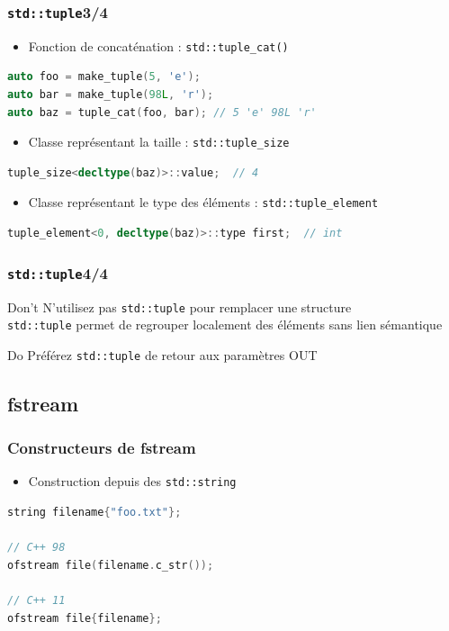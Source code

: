 \documentclass[C++.tex]{subfiles}
\begin{document}
\begin{frame}[fragile]
	\frametitle{\lstinline|std::tuple|\titlehfill{}3/4}
	\begin{itemize}
		\item Fonction de concaténation : \lstinline|std::tuple_cat()|
	\end{itemize}

	\begin{lstlisting}[language=C++]
auto foo = make_tuple(5, 'e');
auto bar = make_tuple(98L, 'r');
auto baz = tuple_cat(foo, bar); // 5 'e' 98L 'r'\end{lstlisting}

	\begin{itemize}
		\item Classe représentant la taille : \lstinline|std::tuple_size|
	\end{itemize}

	\begin{lstlisting}[language=C++]
tuple_size<decltype(baz)>::value;  // 4\end{lstlisting}

	\begin{itemize}
		\item Classe représentant le type des éléments : \lstinline|std::tuple_element|
	\end{itemize}

	\begin{lstlisting}[language=C++]
tuple_element<0, decltype(baz)>::type first;  // int\end{lstlisting}
\end{frame}

\begin{frame}[fragile]
	\frametitle{\lstinline|std::tuple|\titlehfill{}4/4}
	\begin{alertblock}{Don't}
		N'utilisez pas \lstinline|std::tuple| pour remplacer une structure\\
		\lstinline|std::tuple| permet de regrouper localement des éléments sans lien sémantique
	\end{alertblock}

	\begin{exampleblock}{Do}
		Préférez \lstinline|std::tuple| de retour aux paramètres OUT
	\end{exampleblock}
\end{frame}

\subsection*{fstream}
\begin{frame}[fragile]
	\frametitle{Constructeurs de fstream}
	\begin{itemize}
		\item Construction depuis des \lstinline|std::string|
	\end{itemize}

	\begin{lstlisting}[language=C++]
string filename{"foo.txt"};

// C++ 98
ofstream file(filename.c_str());

// C++ 11
ofstream file{filename};\end{lstlisting}
\end{frame}
\end{document}

